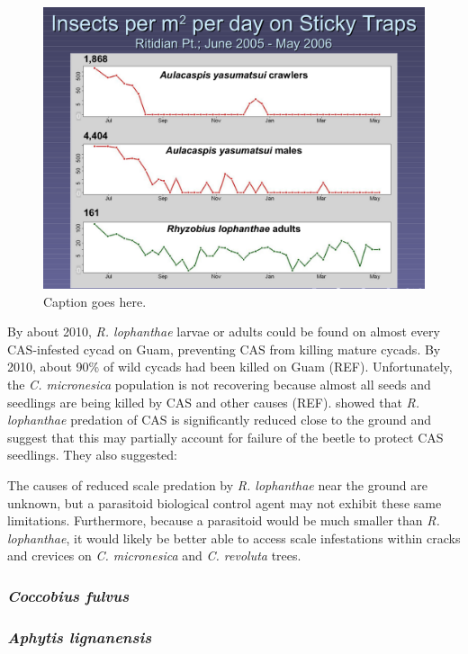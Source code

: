 \documentclass[12pt,letterpaper,english,bibliography=totocnumbered, abstract=on]{scrartcl}
\begin{document}
\begin{figure}[H]
	\centering
	\includegraphics[width=0.7\linewidth]{sticky-traps}
	\caption{Caption goes here.}
	\label{fig:sticky-traps}
\end{figure}

By about 2010, \textit{R. lophanthae} larvae or adults could be found on almost every CAS-infested cycad on Guam, preventing CAS from killing mature cycads. By 2010, about 90\% of wild cycads had been killed on Guam (REF). Unfortunately, the \textit{C. micronesica} population is not recovering because almost all seeds and seedlings are being killed by CAS and other causes (REF). \cite{marlerVerticalStratificationPredation2013} showed that \textit{R. lophanthae} predation of CAS is significantly reduced close to the ground and suggest that this may partially account for failure of the beetle to protect CAS seedlings. They also suggested:
\begin{displayquote}
The causes of reduced scale predation by
\textit{R. lophanthae} near the ground are unknown,
but a parasitoid biological control agent may
not exhibit these same limitations. Furthermore, because a parasitoid would be much
smaller than \textit{R. lophanthae}, it would likely be
better able to access scale infestations within
cracks and crevices on \textit{C. micronesica} and
\textit{C. revoluta} trees.
\end{displayquote}

\subsubsection{\textit{Coccobius fulvus}}  

\subsubsection{\textit{Aphytis lignanensis}}
\end{document}
